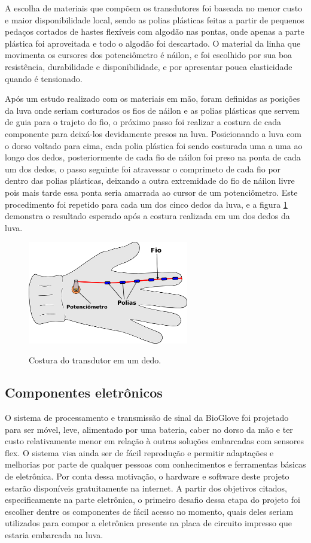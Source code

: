 \documentclass[
	12pt,				%
	openright,			%
	oneside,			%
	a4paper,			%
	english,			%
	brazil				%
	]{abntex2}
\begin{document}
		A escolha de materiais que compõem os transdutores foi baseada no menor custo e maior disponibilidade local, sendo as polias plásticas feitas a partir de pequenos pedaços cortados de hastes flexíveis com algodão nas pontas, onde apenas a parte plástica foi aproveitada e todo o algodão foi descartado. O material da linha que movimenta os cursores dos potenciômetro é náilon, e foi escolhido por sua boa resistência, durabilidade e disponibilidade, e por apresentar pouca elasticidade quando é tensionado.


		Após um estudo realizado com os materiais em mão, foram definidas as posições da luva onde seriam costurados os fios de náilon e as polias plásticas que servem de guia para o trajeto do fio, o próximo passo foi realizar a costura de cada componente para deixá-los devidamente presos na luva. Posicionando a luva com o dorso voltado para cima, cada polia plástica foi sendo costurada uma a uma ao longo dos dedos, posteriormente de cada fio de náilon foi preso na ponta de cada um dos dedos, o passo seguinte foi atravessar o comprimeto de cada fio por dentro das polias plásticas, deixando a outra extremidade do fio de náilon livre pois mais tarde essa ponta seria amarrada ao cursor de um potenciômetro. Este procedimento foi repetido para cada um dos cinco dedos da luva, e a figura \ref{Fig:glove-wire-pot1} demonstra o resultado esperado após a costura realizada em um dos dedos da luva.


		\begin{figure}[h!]
			\centering
			\caption{Costura do transdutor em um dedo.}
  		\includegraphics[width=7cm]{./figures/glove-wire-pot1.png}
  		\label{Fig:glove-wire-pot1}
		\end{figure}

			
			\subsection{Componentes eletrônicos}	

			O sistema de processamento e transmissão de sinal da BioGlove foi projetado para ser móvel, leve, alimentado por uma bateria, caber no dorso da mão e ter custo relativamente menor em relação à outras soluções embarcadas com sensores flex. O sistema visa ainda ser de fácil reprodução e permitir adaptações e melhorias por parte de qualquer pessoas com conhecimentos e ferramentas básicas de eletrônica. Por conta dessa motivação, o hardware e software deste projeto estarão disponíveis gratuitamente na internet. A partir dos objetivos citados, especificamente na parte eletrônica, o primeiro desafio dessa etapa do projeto foi escolher dentre os componentes de fácil acesso no momento, quais deles seriam utilizados para compor a eletrônica presente na placa de circuito impresso que estaria embarcada na luva.
			
\end{document}
